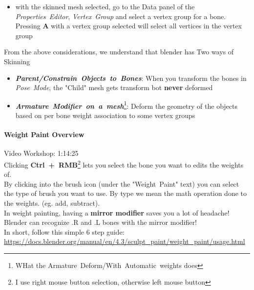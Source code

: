 \documentclass{article}
\begin{document}
\begin{itemize}[noitemsep, topsep=0pt]
    \item with the skinned mesh selected, go to the Data panel of the \mbox{\textit{Properties Editor}}, \mbox{\textit{Vertex Group}} and select a vertex group for a bone. Pressing \textbf{A} with a 
    vertex group selected will select all vertices in the vertex group
\end{itemize}
From the above considerations, we understand that blender has Two ways of Skinning
\begin{itemize}[topsep=0pt, noitemsep]
    \item \mbox{\textit{\textbf{Parent/Constrain Objects to Bones}}}: When you transform the bones in \mbox{\textit{Pose Mode}}, the "Child" mesh gets transform bot \textbf{never} deformed
    \item \mbox{\textit{\textbf{Armature Modifier on a mesh}}}\footnote{WHat the \mbox{Armature Deform/With Automatic weights} does}: Deform the geometry of the objects based on per bone weight 
    association to some vertex groups
\end{itemize}

\paragraph{Weight Paint Overview}
Video Workshop: 1:14:25\\
Clicking \mbox{\textbf{Ctrl + RMB}}\footnote{I use right mouse button selection, otherwise left mouse button} lets you select the bone you want to edits the weights of.\\
By clicking into the brush icon (under the \mbox{"Weight Paint"} text) you can select the type of brush you want to use. By type we mean the math operation done to the weights. (eg. add, subtract).\\
In weight painting, having a \textbf{mirror modifier} saves you a lot of headache! Blender can recognize .R and .L bones with the mirror modifier!\\
In short, follow this simple 6 step guide: \href{https://docs.blender.org/manual/en/4.3/sculpt_paint/weight_paint/usage.html}{https://docs.blender.org/manual/en/4.3/sculpt\_paint/weight\_paint/usage.html}
\end{document}
